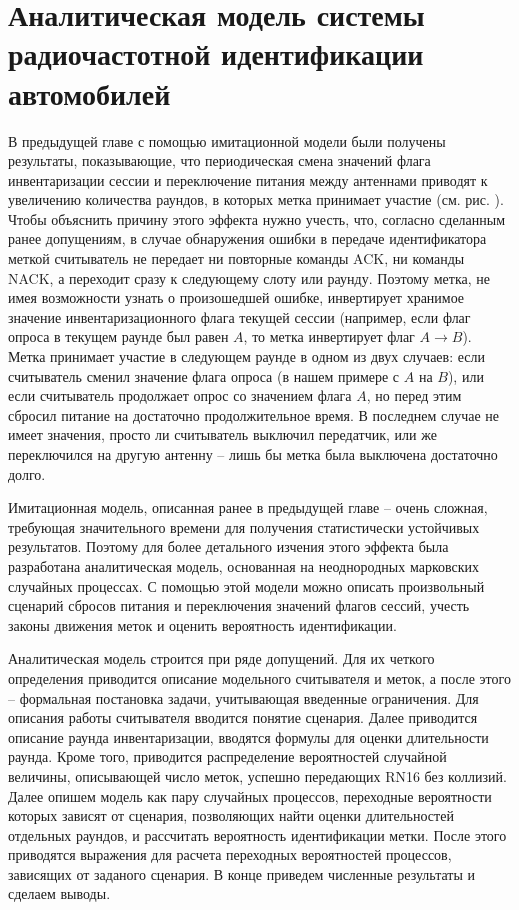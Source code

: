 \chapter{Аналитическая модель системы радиочастотной идентификации автомобилей}\label{ch:ch3}


В предыдущей главе с помощью имитационной модели были получены результаты, показывающие, что периодическая смена значений флага инвентаризации сессии и переключение питания между антеннами приводят к увеличению количества раундов, в которых метка принимает участие (см. рис. ). Чтобы объяснить причину этого эффекта нужно учесть, что, согласно сделанным ранее допущениям, в случае обнаружения ошибки в передаче идентификатора меткой считыватель не передает ни повторные команды ACK, ни команды NACK, а переходит сразу к следующему слоту или раунду. Поэтому метка, не имея возможности узнать о произошедшей ошибке, инвертирует хранимое значение инвентаризационного флага текущей сессии (например, если флаг опроса в текущем раунде был равен $A$, то метка инвертирует флаг $A \rightarrow B$). Метка принимает участие в следующем раунде в одном из двух случаев: если считыватель сменил значение флага опроса (в нашем примере с $A$ на $B$), или если считыватель продолжает опрос со значением флага $A$, но перед этим сбросил питание на достаточно продолжительное время. В последнем случае не имеет значения, просто ли считыватель выключил передатчик, или же переключился на другую антенну -- лишь бы метка была выключена достаточно долго.

Имитационная модель, описанная ранее в предыдущей главе -- очень сложная, требующая значительного времени для получения статистически устойчивых результатов. Поэтому для более детального изчения этого эффекта была разработана аналитическая модель, основанная на неоднородных марковских случайных процессах. С помощью этой модели можно описать произвольный сценарий сбросов питания и переключения значений флагов сессий, учесть законы движения меток и оценить вероятность идентификации.

Аналитическая модель строится при ряде допущений. Для их четкого определения приводится описание модельного считывателя и меток, а после этого -- формальная постановка задачи, учитывающая введенные ограничения. Для описания работы считывателя вводится понятие сценария. Далее приводится описание раунда инвентаризации, вводятся формулы для оценки длительности раунда. Кроме того, приводится распределение вероятностей случайной величины, описывающей число меток, успешно передающих RN16 без коллизий. Далее опишем модель как пару случайных процессов, переходные вероятности которых зависят от сценария, позволяющих найти оценки длительностей отдельных раундов, и рассчитать вероятность идентификации метки. После этого приводятся выражения для расчета переходных вероятностей процессов, зависящих от заданого сценария. В конце приведем численные результаты и сделаем выводы.

